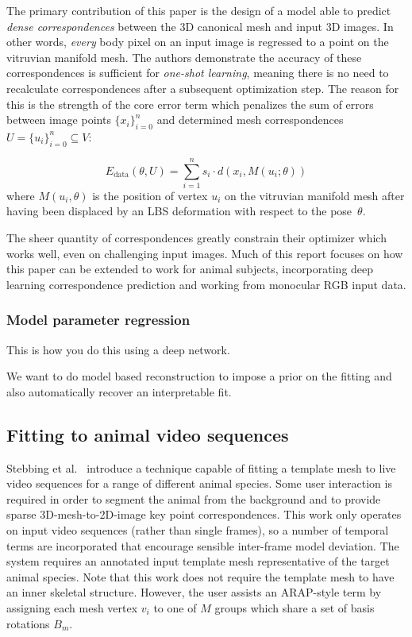     The primary contribution of this paper is the design of a model able to predict \emph{dense correspondences} between the 3D canonical mesh and input 3D images. In other words, \emph{every} body pixel on an input image is regressed to a point on the vitruvian manifold mesh. The authors demonstrate the accuracy of these correspondences is sufficient for \emph{one-shot learning}, meaning there is no need to recalculate correspondences after a subsequent optimization step. The reason for this is the strength of the core error term which penalizes the sum of errors between image points $\{x_{i}\}_{i=0}^{n}$ and determined mesh correspondences $U = \{u_{i}\}_{i=0}^{n} \subseteq V$:

    \begin{equation}
        E_{\text{data}}(\theta,U) =\sum_{i=1}^{n}s_{i} \cdot d(x_{i}, M(u_{i}; \theta))
    \end{equation}
    where $M(u_{i}, \theta)$ is the position of vertex $u_{i}$ on the vitruvian manifold mesh after having been displaced by an LBS deformation with respect to the pose~$\theta$. 

    The sheer quantity of correspondences greatly constrain their optimizer which works well, even on challenging input images. Much of this report focuses on how this paper can be extended to work for animal subjects, incorporating deep learning correspondence prediction and working from monocular RGB input data.

    \subsubsection{Model parameter regression}

    This is how you do this using a deep network. 


We want to do model based reconstruction to impose a prior on the fitting and also automatically recover an interpretable fit. 

\subsection{Fitting to animal video sequences}
Stebbing et al.~\cite{arap_stebbing} introduce a technique capable of fitting a template mesh to live video sequences for a range of different animal species. Some user interaction is required in order to segment the animal from the background and to provide sparse 3D-mesh-to-2D-image key point correspondences. This work only operates on input video sequences (rather than single frames), so a number of temporal terms are incorporated that encourage sensible inter-frame model deviation. The system requires an annotated input template mesh representative of the target animal species. Note that this work does not require the template mesh to have an inner skeletal structure. However, the user assists an ARAP-style term by assigning each mesh vertex $v_i$ to one of $M$ groups which share a set of basis rotations $B_{m}$. 

